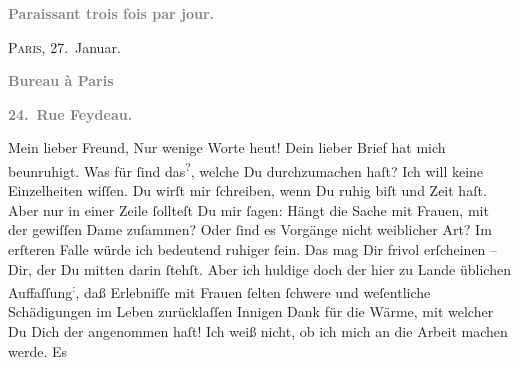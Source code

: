 \begin{ledgroupsized}[t]{13cm}
           \pstart
           \begin{otherlanguage}{french}\textcolor{gray}{\textbf{\textbf{Paraissant trois fois par jour.}}}\end{otherlanguage}\hfill \textsc{Paris}, 27. Januar.\pend
           \pstart
           \begin{otherlanguage}{french}\textcolor{gray}{\textbf{\textbf{Bureau à Paris}}}\end{otherlanguage}\pend
           \pstart
           \begin{otherlanguage}{french}\textcolor{gray}{\textbf{\textbf{24. Rue Feydeau.}}}\end{otherlanguage}\pend
           \pstart\center{}Mein lieber Freund,\pend\pstart
           Nur wenige Worte heut!\pend
           \pstart
           Dein lieber Brief hat mich beunruhigt. Was für \label{K_L02801-1v}\label{K_L02801-1h} ſind das\substVorne{}\textsuperscript{?}\substDazwischen{},\substHinten{} welche Du durchzumachen haſt? Ich will keine Einzelheiten wiſſen. Du wirſt
               mir ſchreiben, wenn Du ruhig biſt und Zeit haſt. Aber nur in einer Zeile ſollteſt Du
               mir ſagen: Hängt die Sache mit Frauen, mit der gewiſſen Dame zuſammen? Oder ſind es Vorgänge nicht
               weiblicher Art? Im erſteren Falle würde ich bedeutend ruhiger  ſein. Das mag Dir frivol erſcheinen – Dir, der Du mitten darin ſtehſt. Aber
               ich {\pb}huldige doch der hier zu Lande üblichen Auffaſſung\substVorne{}\textsuperscript{:}\substDazwischen{},\substHinten{} daß Erlebniſſe mit Frauen ſelten ſchwere und weſentliche Schädigungen im
               Leben zurücklaſſen{\dotsfour}\pend
           \pstart
           Innigen Dank für die Wärme, mit welcher Du Dich der \label{K_L02801-2v}\label{K_L02801-2h} angenommen haſt! Ich weiß nicht, ob ich mich an die Arbeit machen werde. Es

\end{ledgroupsized}
